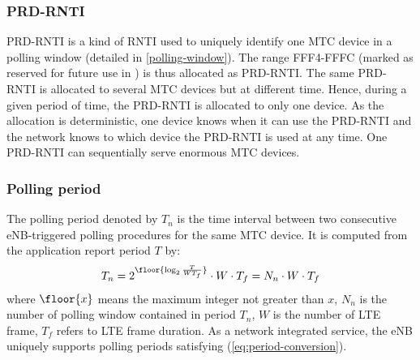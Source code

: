 \subsubsection{PRD-RNTI}
\label{PRD-RNTI}
PRD-RNTI is a kind of RNTI used to uniquely identify one MTC device in a polling window (detailed in \ref{polling-window}).
The range FFF4-FFFC (marked as reserved for future use in \cite{3GPP/TS/36321}) is thus allocated as PRD-RNTI. 
The same PRD-RNTI is allocated to several MTC devices but at different time. Hence, during a given period of time, the PRD-RNTI is allocated to only one device. As the allocation is deterministic, one device knows when it can use the PRD-RNTI and the network knows to which device the PRD-RNTI is used at any time. One PRD-RNTI can sequentially serve enormous MTC devices.

\subsubsection{{Polling period}}
\label{polling-period}
The polling period denoted by $T_n$ is the time interval between two consecutive eNB-triggered polling procedures for the same MTC device. It is computed from the application report period $T$ by:
\begin{align}
T_{n} = 2^{\floor{\log_2 \frac{T}{WT_f}}}\cdot W \cdot T_f =N_{n}\cdot W \cdot T_f\label{eq:period-conversion}
\end{align}
where $\floor{x}$ means the maximum integer not greater than $x$, $N_{n}$ is the number of polling window contained in period $T_{n}$, $W$ is the number of LTE frame, $T_{f}$ refers to LTE frame duration. As a network integrated service, the eNB uniquely supports polling periods satisfying (\ref{eq:period-conversion}). 


